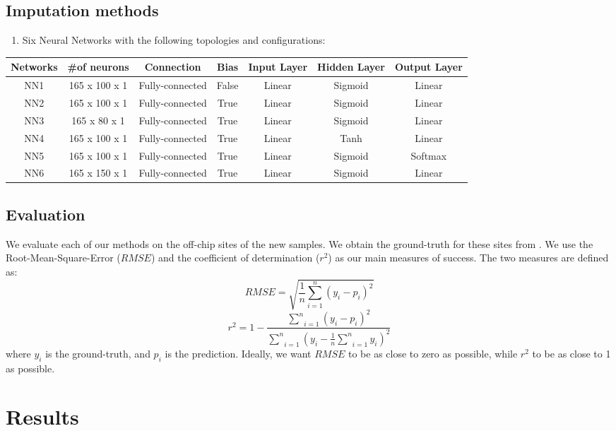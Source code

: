 \documentclass{article} %
\begin{document}
\subsection{Imputation methods}
\begin{enumerate}
\item Six Neural Networks with the following topologies and configurations:
\end{enumerate}
\begin{tabular}{ccccccc}
\toprule 
Networks & \#of neurons & Connection & Bias  & Input Layer & Hidden Layer & Output Layer\tabularnewline
\midrule
\midrule 
NN1 & 165 x 100 x 1 & Fully-connected & False & Linear & Sigmoid & Linear\tabularnewline
\midrule 
NN2 & 165 x 100 x 1 & Fully-connected & True & Linear & Sigmoid & Linear\tabularnewline
\midrule 
NN3 & 165 x 80 x 1 & Fully-connected & True & Linear & Sigmoid & Linear\tabularnewline
\midrule 
NN4 & 165 x 100 x 1 & Fully-connected & True & Linear & Tanh & Linear\tabularnewline
\midrule 
NN5 & 165 x 100 x 1 & Fully-connected & True & Linear & Sigmoid & Softmax\tabularnewline
\midrule 
NN6 & 165 x 150 x 1 & Fully-connected & True & Linear & Sigmoid & Linear\tabularnewline
\bottomrule
\end{tabular}


\subsection{Evaluation}

We evaluate each of our methods on the off-chip sites of the new samples.
We obtain the ground-truth for these sites from \cite{ziller2013charting}.
We use the Root-Mean-Square-Error ($RMSE$) and the coefficient of
determination ($r^{2}$) as our main measures of success. The two
measures are defined as: 
\begin{equation}
RMSE=\sqrt{\frac{1}{n}\underset{i=1}{\overset{n}{\sum}}(y_{i}-p_{i})^{2}}\label{eq:1}
\end{equation}
\begin{equation}
r^{2}=1-\frac{\underset{i=1}{\overset{n}{\sum}}(y_{i}-p_{i})^{2}}{\underset{i=1}{\overset{n}{\sum}}(y_{i}-\frac{1}{n}\underset{i=1}{\overset{n}{\sum}}y_{i})^{2}}\label{eq:2}
\end{equation}
where $y_{i}$ is the ground-truth, and $p_{i}$ is the prediction.
Ideally, we want $RMSE$ to be as close to zero as possible, while
$r^{2}$ to be as close to 1 as possible.


\section{Results}
\end{document}
